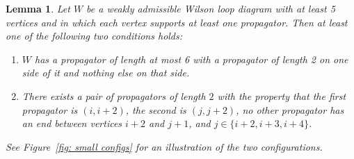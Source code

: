 \documentclass[11pt]{article}
\newtheorem{lem}[thm]{Lemma}
\theoremstyle{remark}
\theoremstyle{definition}
\begin{document}
\begin{lem}\label{lem sian}
  Let $W$ be a weakly admissible Wilson loop diagram with at least 5 vertices and in which each vertex supports at least one propagator.  Then at least one of the following two conditions holds:
  \vspace{-0.5em}
  \begin{enumerate}
    \item $W$ has a propagator of length at most 6 with a propagator of length 2 on one side of it and nothing else on that side.\label{item big and 2} 
    \item There exists a pair of propagators of length $2$ with the property that the first propagator is $(i, i+2)$, the second is $(j, j+2)$, no other propagator has an end between vertices $i+2$ and $j+1$, and $j\in\{i+2, i+3, i+4\}$.\label{item pair of 2s}
  \end{enumerate}
See Figure~\ref{fig: small configs} for an illustration of the two configurations.
\end{lem}
\end{document}
